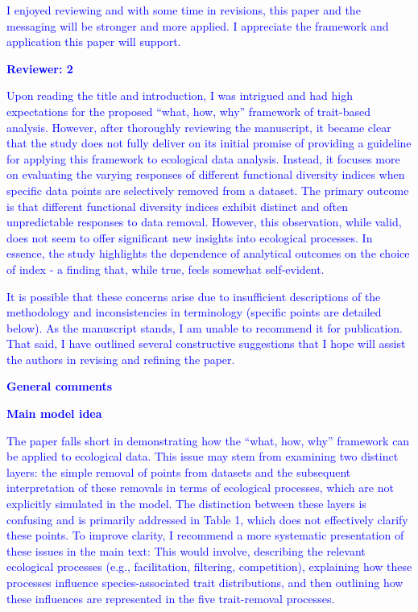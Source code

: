 \documentclass[
]{article}
\begin{document}
\textcolor{blue}{I enjoyed reviewing and with some time in revisions, this paper and the messaging will be stronger and more applied. I appreciate the framework and application this paper will support.}

\textcolor{blue}{\textbf{Reviewer: 2}}

\textcolor{blue}{Upon reading the title and introduction, I was intrigued and had high expectations for the proposed ``what, how, why'' framework of trait-based analysis.
However, after thoroughly reviewing the manuscript, it became clear that the study does not fully deliver on its initial promise of providing a guideline for applying this framework to ecological data analysis.
Instead, it focuses more on evaluating the varying responses of different functional diversity indices when specific data points are selectively removed from a dataset.
The primary outcome is that different functional diversity indices exhibit distinct and often unpredictable responses to data removal.
However, this observation, while valid, does not seem to offer significant new insights into ecological processes.
In essence, the study highlights the dependence of analytical outcomes on the choice of index - a finding that, while true, feels somewhat self-evident.}

\textcolor{blue}{It is possible that these concerns arise due to insufficient descriptions of the methodology and inconsistencies in terminology (specific points are detailed below).
As the manuscript stands, I am unable to recommend it for publication.
That said, I have outlined several constructive suggestions that I hope will assist the authors in revising and refining the paper.}

\textcolor{blue}{\textbf{General comments}}

\textcolor{blue}{\textbf{Main model idea}}

\textcolor{blue}{The paper falls short in demonstrating how the ``what, how, why'' framework can be applied to ecological data.
This issue may stem from examining two distinct layers: the simple removal of points from datasets and the subsequent interpretation of these removals in terms of ecological processes, which are not explicitly simulated in the model.
The distinction between these layers is confusing and is primarily addressed in Table 1, which does not effectively clarify these points.
To improve clarity, I recommend a more systematic presentation of these issues in the main text: This would involve, describing the relevant ecological processes (e.g., facilitation, filtering, competition), explaining how these processes influence species-associated trait distributions, and then outlining how these influences are represented in the five trait-removal processes.}
\end{document}
